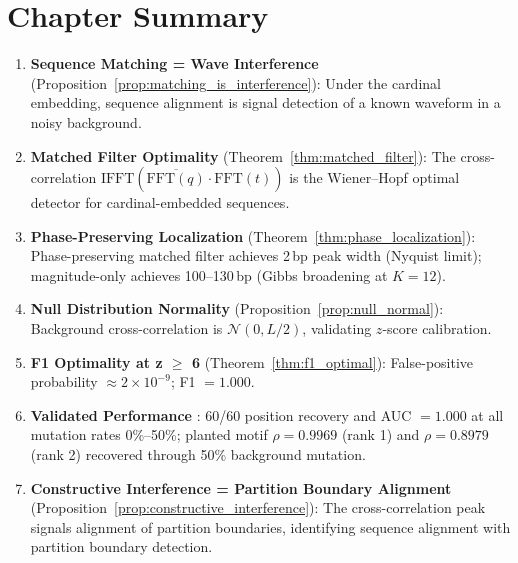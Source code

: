 \section*{Chapter Summary}

\begin{chapterbox}[title=Chapter 27 --- Key Results Established]
\begin{enumerate}[label=\textbf{\arabic*.}]
  \item \textbf{Sequence Matching = Wave Interference}
        (Proposition~\ref{prop:matching_is_interference}): Under the cardinal
        embedding, sequence alignment is signal detection of a known waveform
        in a noisy background.

  \item \textbf{Matched Filter Optimality}
        (Theorem~\ref{thm:matched_filter}): The cross-correlation
        $\mathrm{IFFT}(\overline{\mathrm{FFT}(q)} \cdot \mathrm{FFT}(t))$ is the
        Wiener--Hopf optimal detector for cardinal-embedded sequences.

  \item \textbf{Phase-Preserving Localization}
        (Theorem~\ref{thm:phase_localization}): Phase-preserving matched filter
        achieves 2\,bp peak width (Nyquist limit); magnitude-only achieves
        100--130\,bp (Gibbs broadening at $K=12$).

  \item \textbf{Null Distribution Normality} (Proposition~\ref{prop:null_normal}):
        Background cross-correlation is $\mathcal{N}(0, L/2)$, validating
        $z$-score calibration.

  \item \textbf{F1 Optimality at z $\geq$ 6} (Theorem~\ref{thm:f1_optimal}):
        False-positive probability $\approx 2\times10^{-9}$; F1 $= 1.000$.

  \item \textbf{Validated Performance} \citep{Sachikonye2025_Interference}:
        60/60 position recovery and AUC $= 1.000$ at all mutation rates
        0\%--50\%; planted motif $\rho = 0.9969$ (rank 1) and $\rho = 0.8979$
        (rank 2) recovered through 50\% background mutation.

  \item \textbf{Constructive Interference = Partition Boundary Alignment}
        (Proposition~\ref{prop:constructive_interference}): The cross-correlation
        peak signals alignment of partition boundaries, identifying sequence
        alignment with partition boundary detection.


\end{enumerate}
\end{chapterbox}
